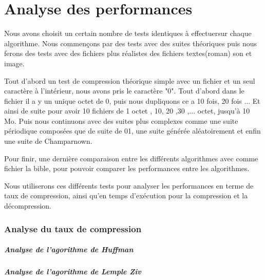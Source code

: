 \documentclass{report}
\begin{document}
\part*{Analyse des performances}
Nous avons choisit un certain nombre de tests identiques à effectuersur chaque algorithme. Nous commençons par des tests avec des suites théoriques puis nous ferons des tests avec des fichiers plus réalistes des fichiers textes(roman) son et image.
 
Tout d'abord un test de compression théorique simple avec un fichier et un seul caractère à l'intérieur, nous avons pris le caractère "0".
Tout d'abord dans le fichier il a y un unique octet de 0, puis nous dupliquons ce a 10 fois, 20 fois ... Et ainsi de suite pour avoir 10 fichiers de 1 octet , 10, 20 ,30 ,...  octet, jusqu'à 10 Mo.
Puis nous continuons avec des suites plus complexes comme une suite périodique composées que de suite de 01, une suite générée aléatoirement et enfin une suite de Champarnown.  

Pour finir, une dernière comparaison entre les différents algorithmes avec comme fichier la bible, pour pouvoir comparer les performances entre les algorithmes.

Nous utiliserons ces différents tests pour analyser les performances en terme de taux de compression, ainsi qu'en temps d’exécution pour la compression et la décompression. 
\section*{Analyse du taux de compression}
\subsubsection{ Analyse de l'agorithme de Huffman}



\subsubsection{ Analyse de l'agorithme de Lemple Ziv}
\end{document}
